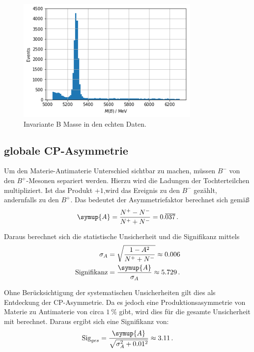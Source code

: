 \begin{figure}[htb]
  \centering
  \includegraphics[width=0.8\textwidth]{plots/real_data_inv_masse_B.png}
  \caption{Invariante B Masse in den echten Daten.}
  \label{fig:realBMass}
\end{figure}

\newpage

\subsection{globale CP-Asymmetrie}
\label{sec:globCP}

Um den Materie-Antimaterie Unterschied sichtbar zu machen, m\"ussen $B^{-}$ von den $B^{+}$-Mesonen separiert werden.
Hierzu wird die Ladungen der Tochterteilchen multipliziert.
Ist das Produkt $+1$,wird das Ereignis zu den $B^{-}$ gez\"ahlt, andernfalls zu den $B^{+}$.
Das bedeutet der Asymmetriefaktor berechnet sich gem\"a\ss
\begin{equation}
  \symup{A} = \frac{N^{+} - N^{-}}{N^{+} + N^{-}} = 0.\overline{037} \, .
  \label{eqn:globCP}
\end{equation}

Daraus berechnet sich die statistische Unsicherheit und die Signifikanz mittels
\begin{align}
  \label{eqn:sigmaCP}
  \sigma_A &= \sqrt{\frac{1 - A^2}{N^{+} + N^{-}} } \approx 0.006 \\
  \label{eqn:signifikanzCP}
  \text{Signifikanz} &= \frac{\symup{A}}{\sigma_A} \approx 5.729 \, .
\end{align}

Ohne Ber\"ucksichtigung der systematischen Unsicherheiten gilt dies als Entdeckung der CP-Asymmetrie.
Da es jedoch eine Produktionsasymmetrie von Materie zu Antimaterie von circa $\SI{1}{\percent}$ gibt, wird dies f\"ur die gesamte Unsicherheit mit berechnet.
Daraus ergibt sich eine Signifikanz von:
\begin{equation}
  \text{Sig}_{ges} = \frac{\symup{A}}{\sqrt{\sigma_A^2 + 0.01^2}} \approx 3.11 \, .
\end{equation}

